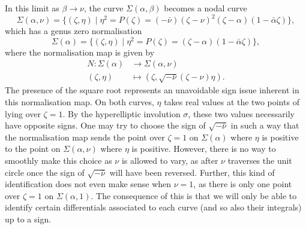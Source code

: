 In this limit as $β \to ν$, the curve $Σ(α,β)$ becomes a nodal curve
\[
Σ(α,ν) = \{ (ζ,η) \mid η^2 = P(ζ) = (-\bar{ν})(ζ-ν)^2 (ζ-α)(1-\bar{α}ζ) \},
\]
which has a genus zero normalisation
\[
Σ(α) = \{ (ζ,η) \mid η^2 = P(ζ) = (ζ-α)(1-\bar{α}ζ) \},
\]
where the normalisation map is given by
\begin{align*}
N : Σ(α) &\to Σ(α,ν) \\
(ζ,η)  &\mapsto (ζ,\sqrt{-\bar{ν}}(ζ-ν) η).
\end{align*}
The presence of the square root represents an unavoidable sign issue inherent in this normalisation map. On both curves, $η$ takes real values at the two points of lying over $ζ=1$. By the hyperelliptic involution $σ$, these two values necessarily have opposite signs. One may try to choose the sign of $\sqrt{-\bar{ν}}$ in such a way that the normalisation map sends the point over $ζ=1$ on $Σ(α)$ where $η$ is positive to the point on $Σ(α,ν)$ where $η$ is positive. However, there is no way to smoothly make this choice as $ν$ is allowed to vary, as after $ν$ traverses the unit circle once the sign of $\sqrt{-\bar{ν}}$ will have been reversed. Further, this kind of identification does not even make sense when $ν=1$, as there is only one point over $ζ=1$ on $Σ(α,1)$. The consequence of this is that we will only be able to identify certain differentials associated to each curve (and so also their integrals) up to a sign.

